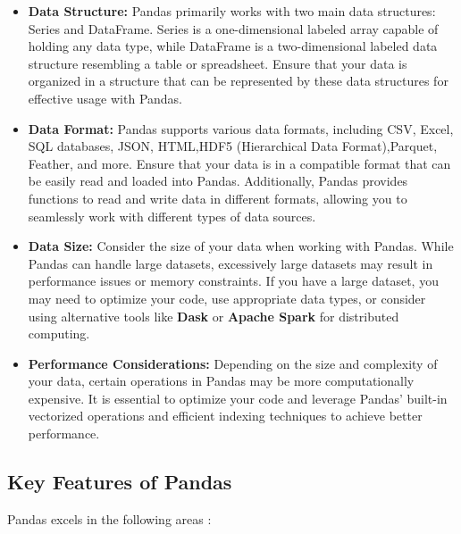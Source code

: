 	\begin{itemize}
		
		\item \textbf{Data Structure:} Pandas primarily works with two main data structures: Series and DataFrame. Series is a one-dimensional labeled array capable of holding any data type, while DataFrame is a two-dimensional labeled data structure resembling a table or spreadsheet. Ensure that your data is organized in a structure that can be represented by these data structures for effective usage with Pandas.
		
		\item \textbf{Data Format:} Pandas supports various data formats, including CSV, Excel, SQL databases, JSON, HTML,HDF5 (Hierarchical Data Format),Parquet, Feather, and more. Ensure that your data is in a compatible format that can be easily read and loaded into Pandas. Additionally, Pandas provides functions to read and write data in different formats, allowing you to seamlessly work with different types of data sources.
		
		\item \textbf{Data Size:} Consider the size of your data when working with Pandas. While Pandas can handle large datasets, excessively large datasets may result in performance issues or memory constraints. If you have a large dataset, you may need to optimize your code, use appropriate data types, or consider using alternative tools like \textbf{Dask} or \textbf{Apache Spark} for distributed computing.
		
		\item \textbf{Performance Considerations:} Depending on the size and complexity of your data, certain operations in Pandas may be more computationally expensive. It is essential to optimize your code and leverage Pandas' built-in vectorized operations and efficient indexing techniques to achieve better performance.
		
	\end{itemize}

	\subsection{Key Features of Pandas}
	
	Pandas excels in the following areas \cite{pandas:2021}:
	
